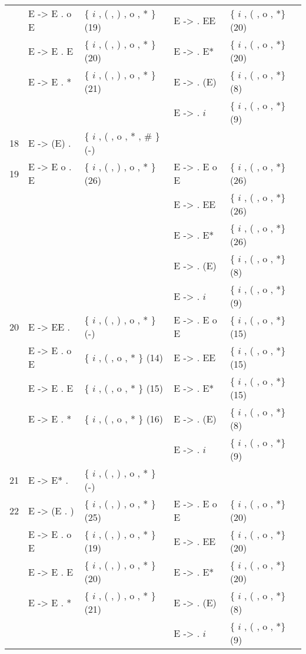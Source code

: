 \begin{center}
\begin{longtable}{c|ll|ll}
 &   E -> E . o E & \{ $i$ , ( , ) , o , * \} (19) & E ->  . EE  & \{ $i$ , ( , o , *\} (20)\\
 &   E -> E . E  & \{ $i$ , ( , ) , o , * \} (20) & E ->  . E*  & \{ $i$ , ( , o , *\} (20)\\
 &   E -> E . *  & \{ $i$ , ( , ) , o , * \} (21) & E ->  . (E) & \{ $i$ , ( , o , *\} (8)\\
 &              &                & E ->  . $i$   & \{ $i$ , ( , o , *\} (9)\\
\hline
18 &   E -> (E) .  & \{ $i$ , ( , o , * , \# \} (-)\\
\hline
19 &   E -> E o . E & \{ $i$ , ( , ) , o , * \} (26) & E ->  . E o E & \{ $i$ , ( , o , *\} (26)\\
 &              &                & E ->  . EE  & \{ $i$ , ( , o , *\} (26)\\
 &              &                & E ->  . E*  & \{ $i$ , ( , o , *\} (26)\\
 &              &                & E ->  . (E) & \{ $i$ , ( , o , *\} (8)\\
 &              &                & E ->  . $i$   & \{ $i$ , ( , o , *\} (9)\\
\hline
20 &   E -> EE .   & \{ $i$ , ( , ) , o , * \} (-) & E ->  . E o E & \{ $i$ , ( , o , *\} (15)\\
 &   E -> E . o E & \{ $i$ , ( , o , *   \} (14) & E ->  . EE  & \{ $i$ , ( , o , *\} (15)\\
 &   E -> E . E  & \{ $i$ , ( , o , *   \} (15) & E ->  . E*  & \{ $i$ , ( , o , *\} (15)\\
 &   E -> E . *  & \{ $i$ , ( , o , *   \} (16) & E ->  . (E) & \{ $i$ , ( , o , *\} (8)\\
 &              &                & E ->  . $i$   & \{ $i$ , ( , o , *\} (9)\\
\hline
21 &   E -> E* .   & \{ $i$ , ( , ) , o , * \} (-)\\
\hline
22 &   E -> (E . ) & \{ $i$ , ( , ) , o , * \} (25) & E ->  . E o E & \{ $i$ , ( , o , *\} (20)\\
 &   E -> E . o E & \{ $i$ , ( , ) , o , * \} (19) & E ->  . EE  & \{ $i$ , ( , o , *\} (20)\\
 &   E -> E . E  & \{ $i$ , ( , ) , o , * \} (20) & E ->  . E*  & \{ $i$ , ( , o , *\} (20)\\
 &   E -> E . *  & \{ $i$ , ( , ) , o , * \} (21) & E ->  . (E) & \{ $i$ , ( , o , *\} (8)\\
 &              &                & E ->  . $i$   & \{ $i$ , ( , o , *\} (9)\\

\end{longtable}
\end{center}
